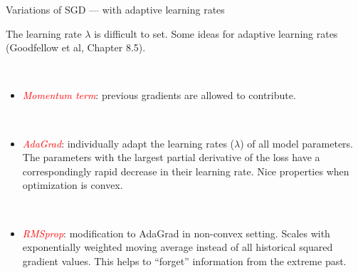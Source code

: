 \documentclass[10pt,ignorenonframetext,]{beamer}
\providecommand{\tightlist}{%
  \setlength{\itemsep}{0pt}\setlength{\parskip}{0pt}}
\begin{document}
\begin{frame}

\begin{block}{Variations of SGD --- with adaptive learning rates}

\vspace{2mm}

The learning rate \(\lambda\) is difficult to set. Some ideas for
adaptive learning rates (Goodfellow et al, Chapter 8.5).

\(~\)

\begin{itemize}
\tightlist
\item
  \emph{\textcolor{red}{Momentum term}}: previous gradients are allowed
  to contribute.
\end{itemize}

\(~\)

\begin{itemize}
\tightlist
\item
  \emph{\textcolor{red}{AdaGrad}}: individually adapt the learning rates
  (\(\lambda\)) of all model parameters. The parameters with the largest
  partial derivative of the loss have a correspondingly rapid decrease
  in their learning rate. Nice properties when optimization is convex.
\end{itemize}

\(~\)

\begin{itemize}
\tightlist
\item
  \emph{\textcolor{red}{RMSprop}}: modification to AdaGrad in non-convex
  setting. Scales with exponentially weighted moving average instead of
  all historical squared gradient values. This helps to ``forget''
  information from the extreme past.
\end{itemize}

\end{block}

\end{frame}
\end{document}
